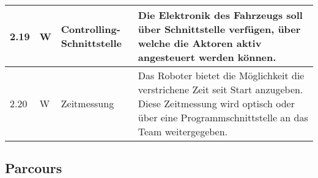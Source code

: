 \documentclass[main.tex]{subfiles} %
\begin{document}
\begin{tabular}{|l|p{0.5cm}|p{4cm}|p{10cm}|}
  \hline
  2.19         & W          & Controlling-Schnittstelle & Die Elektronik des Fahrzeugs soll über Schnittstelle verfügen, über welche die Aktoren aktiv angesteuert werden können.                                                                                                     \\
  \hline
  2.20         & W          & Zeitmessung               & Das Roboter bietet die Möglichkeit die verstrichene Zeit seit Start anzugeben. Diese Zeitmessung wird optisch oder über eine Programmschnittstelle an das Team weitergegeben.                                               \\
  \hline
\end{tabular}

\subsection*{Parcours}
\end{document}
